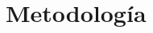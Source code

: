 %
%
%
%
%
%
\newcommand{\hldig}[1]{{\setlength{\fboxsep}{0.5pt}\colorbox{yellow!40}{$#1$}}}
\newcommand{\nuevo}[1]{\textcolor{blue}{#1}}
\newcommand{\falta}[1]{{\color{red}\footnotesize\textsf{[FALTA: #1]}}}

\section*{Metodología}\label{sec:experimentos}

